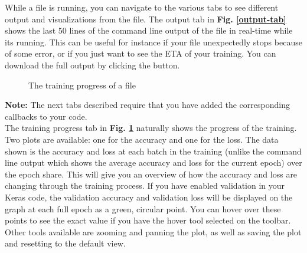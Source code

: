 \noindent While a file is running, you can navigate to the various tabs to see different output and visualizations from the file. The output tab in \textbf{Fig. \ref{output-tab}} shows the last 50 lines of the command line output of the file in real-time while its running. This can be useful for instance if your file unexpectedly stops because of some error, or if you just want to see the ETA of your training. You can download the full output by clicking the button. \\


\begin{figure}[h!]
    \centering
        \caption{The training progress of a file}
        \label{trainingprog-tab}
\end{figure}

\noindent \textbf{Note: }The next tabs described require that you have added the corresponding callbacks to your code. \\ %

\noindent The training progress tab in \textbf{Fig. \ref{trainingprog-tab}} naturally shows the progress of the training. Two plots are available: one for the accuracy and one for the loss. The data shown is the accuracy and loss at each batch in the training (unlike the command line output which shows the average accuracy and loss for the current epoch) over the epoch share. This will give you an overview of how the accuracy and loss are changing through the training process. If you have enabled validation in your Keras code, the validation accuracy and validation loss will be displayed on the graph at each full epoch as a green, circular point. You can hover over these points to see the exact value if you have the hover tool selected on the toolbar. Other tools available are zooming and panning the plot, as well as saving the plot and resetting to the default view. \\

